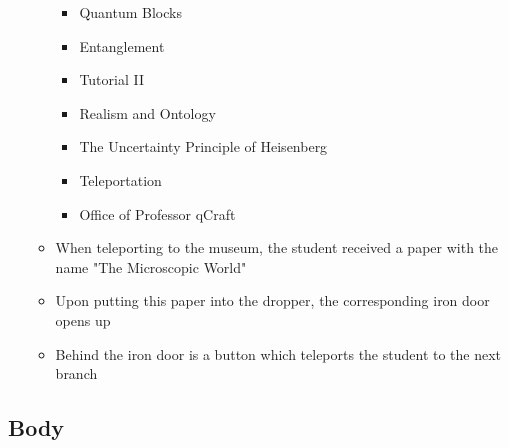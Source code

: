 \documentclass[11pt,twoside]{report} %
\begin{document}
\begin{itemize}
\begin{itemize}
\begin{itemize}
			\item Quantum Blocks
			\item Entanglement
			\item Tutorial II
			\item Realism and Ontology
			\item The Uncertainty Principle of Heisenberg
			\item Teleportation
			\item Office of Professor qCraft
		\end{itemize}
		\item When teleporting to the museum, the student received a paper with the name "The Microscopic World"
		\item Upon putting this paper into the dropper, the corresponding iron door opens up
		\item Behind the iron door is a button which teleports the student to the next branch
	\end{itemize}
\end{itemize}

\subsection{Body}
\end{document}
